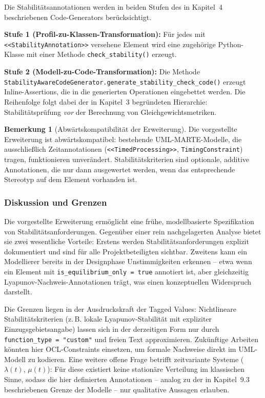 ﻿\documentclass[a4paper,12pt]{scrreprt}
\theoremstyle{definition}
\newtheorem{bemerkung}{Bemerkung}[section]
\begin{document}
Die Stabilitätsannotationen werden in beiden Stufen des in Kapitel~4
beschriebenen Code-Generators berücksichtigt.

\textbf{Stufe 1 (Profil-zu-Klassen-Transformation):} Für jedes mit
\texttt{<<StabilityAnnota\newline tion>>} versehene Element wird eine zugehörige
Python-Klasse mit einer Methode \texttt{check\_\newline stability()} erzeugt.

\textbf{Stufe 2 (Modell-zu-Code-Transformation):} Die Methode
\texttt{StabilityAwareCode\newline Generator\allowbreak.generate\_stability\_check\_code()}
erzeugt Inline-Assertions, die in die generierten Operationen eingebettet
werden. Die Reihenfolge folgt dabei der in Kapitel~3 begründeten Hierarchie:
Stabilitätsprüfung \textit{vor} der Berechnung von Gleichgewichtsmetriken.

\begin{bemerkung}[Abwärtskompatibilität der Erweiterung]
	Die vorgestellte Erweiterung ist abwärtskompatibel: bestehende
	UML-MARTE-Modelle, die ausschließlich Zeitannotationen
	(\texttt{<<TimedProcessing>>}, \texttt{TimingConstraint}) tragen,
	funktionieren unverändert. Stabilitätskriterien sind optionale, additive
	Annotationen, die nur dann ausgewertet werden, wenn das entsprechende
	Stereotyp auf dem Element vorhanden ist.
\end{bemerkung}

\subsubsection{Diskussion und Grenzen}

Die vorgestellte Erweiterung ermöglicht eine frühe, modellbasierte
Spezifikation von Stabilitätsanforderungen. Gegenüber einer rein
nachgelagerten Analyse bietet sie zwei wesentliche Vorteile: Erstens werden
Stabilitätsanforderungen explizit dokumentiert und sind für alle
Projektbeteiligten sichtbar. Zweitens kann ein Modellierer bereits in der
Designphase Unstimmigkeiten erkennen -- etwa wenn ein Element mit
\texttt{is\_equilibrium\_only = true} annotiert ist, aber gleichzeitig
Lyapunov-Nachweis-Annotationen trägt, was einen konzeptuellen Widerspruch
darstellt.

Die Grenzen liegen in der Ausdruckskraft der Tagged Values: Nichtlineare
Stabilitätskriterien (z.\,B. lokale Lyapunov-Stabilität mit expliziter
Einzugsgebietsangabe) lassen sich in der derzeitigen Form nur durch
\texttt{function\_type = "custom"} und freien Text approximieren. Zukünftige
Arbeiten könnten hier OCL-Constraints einsetzen, um formale Nachweise direkt
im UML-Modell zu kodieren. Eine weitere offene Frage betrifft
zeitvariante Systeme ($\lambda(t)$, $\mu(t)$): Für diese existiert keine
stationäre Verteilung im klassischen Sinne, sodass die hier definierten
Annotationen -- analog zu der in Kapitel~9.3 beschriebenen Grenze der
Modelle -- nur qualitative Aussagen erlauben.
\end{document}
